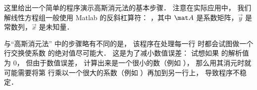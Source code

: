 

这里给出一个简单的程序演示高斯消元法的基本步骤． 注意在实际应用中， 我们解线性方程组一般使用 Matlab 的反斜杠算符： ，其中 $\mat A$ 是系数矩阵，$\vec y$ 是常数列，$\vec x$ 是未知量．


与“高斯消元法” 中的步骤略有不同的是， 该程序在处理每一行   时都会试图做一个行交换使系数  的绝对值尽可能大． 这是为了减小数值误差： 试想如果  的解析值为 0， 但由于数值误差， 计算出来是一个很小的数（例如 ）， 那么用其消元时就可能需要将第  行乘以一个很大的系数（例如 ）再加到另一行上， 导致程序不稳定．

